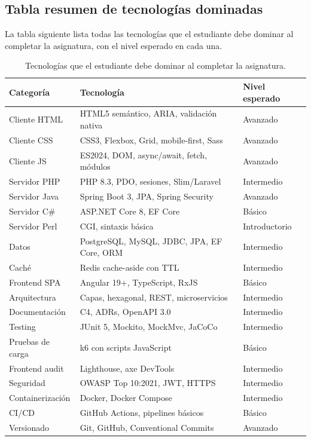 \documentclass[11pt,a4paper,openany]{book}
\begin{document}
\subsection{Tabla resumen de tecnologías dominadas}

La tabla siguiente lista todas las tecnologías que el
estudiante debe dominar al completar la asignatura, con el nivel
esperado en cada una.


\begin{table}[htbp]
\centering
\caption{Tecnologías que el estudiante debe dominar al completar la asignatura.}
\footnotesize
\begin{tabularx}{\textwidth}{lXl}
\toprule
\textbf{Categoría} & \textbf{Tecnología} & \textbf{Nivel esperado}\\
\midrule
Cliente HTML & HTML5 semántico, ARIA, validación nativa & Avanzado\\
Cliente CSS & CSS3, Flexbox, Grid, mobile-first, Sass & Avanzado\\
Cliente JS & ES2024, DOM, async/await, fetch, módulos & Avanzado\\
Servidor PHP & PHP 8.3, PDO, sesiones, Slim/Laravel & Intermedio\\
Servidor Java & Spring Boot 3, JPA, Spring Security & Avanzado\\
Servidor C\# & ASP.NET Core 8, EF Core & Básico\\
Servidor Perl & CGI, sintaxis básica & Introductorio\\
Datos & PostgreSQL, MySQL, JDBC, JPA, EF Core, ORM & Intermedio\\
Caché & Redis cache-aside con TTL & Intermedio\\
Frontend SPA & Angular 19+, TypeScript, RxJS & Básico\\
Arquitectura & Capas, hexagonal, REST, microservicios & Intermedio\\
Documentación & C4, ADRs, OpenAPI 3.0 & Intermedio\\
Testing & JUnit 5, Mockito, MockMvc, JaCoCo & Intermedio\\
Pruebas de carga & k6 con scripts JavaScript & Básico\\
Frontend audit & Lighthouse, axe DevTools & Intermedio\\
Seguridad & OWASP Top 10:2021, JWT, HTTPS & Intermedio\\
Containerización & Docker, Docker Compose & Intermedio\\
CI/CD & GitHub Actions, pipelines básicos & Básico\\
Versionado & Git, GitHub, Conventional Commits & Avanzado\\
\bottomrule
\end{tabularx}
\end{table}
\end{document}
